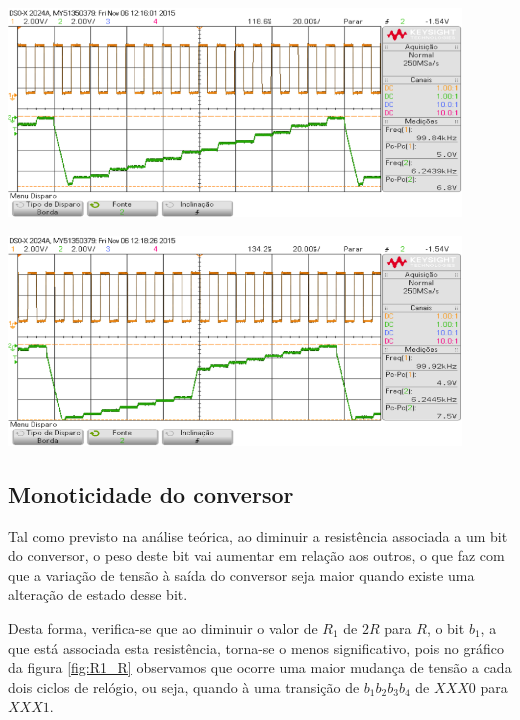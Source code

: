 \documentclass[a4paper,11pt]{report}
\begin{document}
\begin{center}
     \includegraphics[angle=0,width=0.9\textwidth]{R1_R.png}
     \label{fig:R1_R}
     \end{center}


\begin{center}
     \includegraphics[angle=0,width=0.9\textwidth]{R4_R.png}
     \label{fig:R4_R}
     \end{center}

\subsection{Monoticidade do conversor}

Tal como previsto na análise teórica, ao diminuir a resistência associada a um bit do conversor, o peso deste bit vai aumentar em relação aos outros, o que faz com que a variação de tensão à saída do conversor seja maior quando existe uma alteração de estado desse bit.

Desta forma, verifica-se que ao diminuir o valor de $R_1$ de $2R$ para $R$, o bit $b_1$, a que está associada esta resistência, torna-se o menos significativo, pois no gráfico da figura \ref{fig:R1_R} observamos que ocorre uma maior mudança de tensão a cada dois ciclos de relógio, ou seja, quando à uma transição de $b_1b_2b_3b_4$ de $XXX0$ para $XXX1$.
\end{document}
